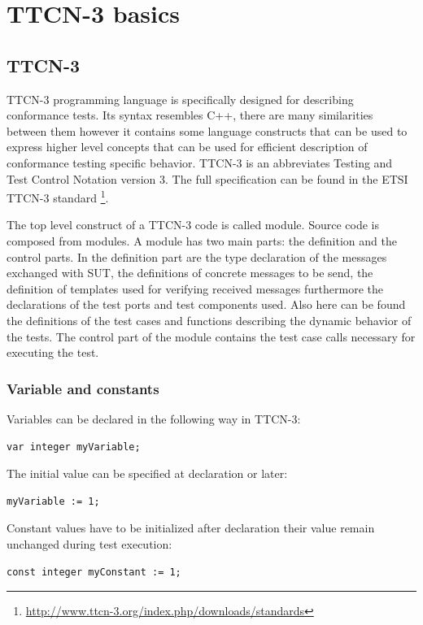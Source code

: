 \documentclass[a4paper]{article}
\begin{document}
\section{TTCN-3 basics}
\subsection{TTCN-3}
TTCN-3 programming language is specifically designed for describing conformance tests. Its syntax resembles C++, there are many similarities between them however it contains some language constructs that can be used to express higher level concepts that can be used for efficient description of conformance testing specific behavior. TTCN-3 is an abbreviates Testing and Test Control Notation version 3. The full specification can be found in the ETSI TTCN-3 standard \cite{ttcn3}
\footnote{\url{http://www.ttcn-3.org/index.php/downloads/standards}}.

The top level construct of a TTCN-3 code is called module. Source code is composed from modules. A module has two main parts: the definition and the control parts. In the definition part are the type declaration of the messages exchanged with SUT, the definitions of concrete messages to be send, the definition of templates used for verifying received messages furthermore the declarations of the test ports and test components used. Also here can be found the definitions of the test cases and functions describing the dynamic behavior of the tests. The control part of the module contains the test case calls necessary for executing the test.

\subsubsection{Variable and constants}

Variables can be declared in the following way in TTCN-3:

{\footnotesize
\begin{lstlisting}
var integer myVariable;
\end{lstlisting}
}

The initial value can be specified at declaration or later:
{\footnotesize
\begin{lstlisting}
myVariable := 1;
\end{lstlisting}
}

Constant values have to be initialized after declaration their value remain unchanged during test execution:

{\footnotesize
\begin{lstlisting}
const integer myConstant := 1;
\end{lstlisting}
} 
\end{document}
